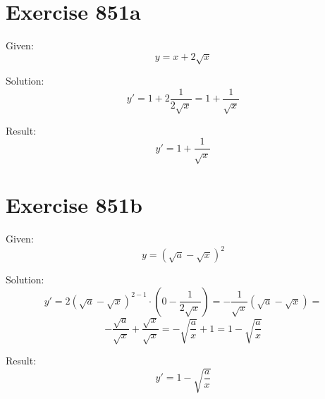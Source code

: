 \documentclass[a4paper, 10pt]{scrartcl}
\begin{document}
\section{Exercise 851a}

Given:
\[
y = x + 2\sqrt{x}
\]

Solution:
\[
y' = 1 + 2\frac{1}{2\sqrt{x}} = 1 + \frac{1}{\sqrt{x}}
\]

Result:
\[
y' = 1 + \frac{1}{\sqrt{x}}
\]

\section{Exercise 851b}

Given:
\[
y = (\sqrt{a} - \sqrt{x})^{2}
\]

Solution:
\[
y' = 2(\sqrt{a} - \sqrt{x})^{2 - 1}\cdot(0 - \frac{1}{2\sqrt{x}}) = -\frac{1}{\sqrt{x}}(\sqrt{a} - \sqrt{x}) =
\]
\[
-\frac{\sqrt{a}}{\sqrt{x}} + \frac{\sqrt{x}}{\sqrt{x}} = -\sqrt{\frac{a}{x}} + 1 = 1 - \sqrt{\frac{a}{x}}
\]

Result:
\[
y' = 1 - \sqrt{\frac{a}{x}}
\]
\end{document}
